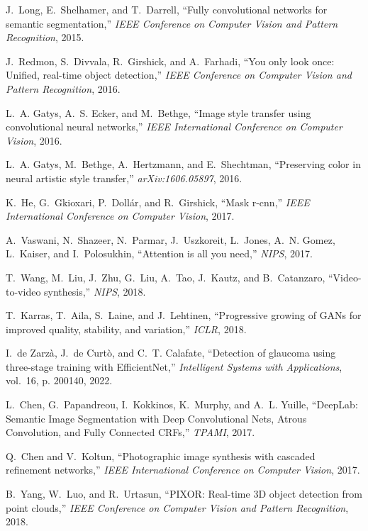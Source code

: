 \documentclass[lettersize,journal]{IEEEtran}
\begin{document}
\begin{thebibliography}{10}
J.~Long, E.~Shelhamer, and T.~Darrell, ``Fully convolutional networks for
  semantic segmentation,'' \emph{IEEE Conference on Computer Vision and Pattern
  Recognition}, 2015.

J.~Redmon, S.~Divvala, R.~Girshick, and A.~Farhadi, ``You only look once:
  Unified, real-time object detection,'' \emph{{IEEE} Conference on Computer
  Vision and Pattern Recognition}, 2016.

L.~A. Gatys, A.~S. Ecker, and M.~Bethge, ``Image style transfer using
  convolutional neural networks,'' \emph{{IEEE} International Conference on
  Computer Vision}, 2016.

L.~A. Gatys, M.~Bethge, A.~Hertzmann, and E.~Shechtman, ``Preserving color in
  neural artistic style transfer,'' \emph{arXiv:1606.05897}, 2016.

K.~He, G.~Gkioxari, P.~Doll\'ar, and R.~Girshick, ``Mask r-cnn,'' \emph{{IEEE}
  International Conference on Computer Vision}, 2017.

A.~Vaswani, N.~Shazeer, N.~Parmar, J.~Uszkoreit, L.~Jones, A.~N. Gomez,
  L.~Kaiser, and I.~Polosukhin, ``Attention is all you need,'' \emph{NIPS},
  2017.

T.~Wang, M.~Liu, J.~Zhu, G.~Liu, A.~Tao, J.~Kautz, and B.~Catanzaro,
  ``Video-to-video synthesis,'' \emph{NIPS}, 2018.

T.~Karras, T.~Aila, S.~Laine, and J.~Lehtinen, ``Progressive growing of {GANs}
  for improved quality, stability, and variation,'' \emph{ICLR}, 2018.

I.~{de Zarzà}, J.~{de Curtò}, and C.~T. Calafate, ``Detection of glaucoma
  using three-stage training with {EfficientNet},'' \emph{Intelligent Systems
  with Applications}, vol.~16, p. 200140, 2022.

L.~Chen, G.~Papandreou, I.~Kokkinos, K.~Murphy, and A.~L. Yuille, ``{DeepLab:
  Semantic Image Segmentation with Deep Convolutional Nets, Atrous Convolution,
  and Fully Connected CRFs},'' \emph{TPAMI}, 2017.

Q.~Chen and V.~Koltun, ``Photographic image synthesis with cascaded refinement
  networks,'' \emph{{IEEE} International Conference on Computer Vision}, 2017.

B.~Yang, W.~Luo, and R.~Urtasun, ``{PIXOR}: Real-time {3D} object detection
  from point clouds,'' \emph{IEEE Conference on Computer Vision and Pattern
  Recognition}, 2018.


\end{thebibliography}
\end{document}
